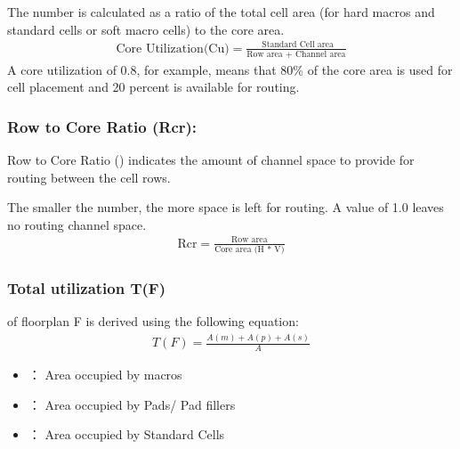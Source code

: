 \documentclass[letterpaper,10pt,english]{sphinxmanual}
\begin{document}
\sphinxAtStartPar
The number is calculated as a ratio of the total cell area (for hard macros and standard cells or soft macro cells) to the core area.
\begin{equation}\label{equation:chapter5/确定芯片面积:math-single}
\begin{split}\text{Core Utilization(Cu)} =\frac{\text{ Standard Cell area}}{\text{Row area + Channel area}}\end{split}
\end{equation}
\sphinxAtStartPar
A core utilization of 0.8, for example, means that 80\% of the core area is used for cell placement and 20 percent is available for routing.


\subsubsection{Row to Core Ratio (Rcr):}
\label{\detokenize{chapter5/_u786e_u5b9a_u82af_u7247_u9762_u79ef:row-to-core-ratio-rcr}}
\sphinxAtStartPar
Row to Core Ratio () indicates the amount of channel space to provide for routing between the cell rows.

\sphinxAtStartPar
The smaller the number, the more space is left for routing. A value of 1.0 leaves no routing channel space.
\begin{equation}\label{equation:chapter5/确定芯片面积:math-single}
\begin{split}\text{Rcr} = \frac{\text{Row area}}{\text{Core area (H * V)}}\end{split}
\end{equation}

\subsubsection{Total utilization T(F)}
\label{\detokenize{chapter5/_u786e_u5b9a_u82af_u7247_u9762_u79ef:total-utilization-t-f}}
\sphinxAtStartPar
{}  of floorplan F is derived using the following equation:
\begin{equation}\label{equation:chapter5/确定芯片面积:math-single}
\begin{split}T(F) =\frac{A(m) + A(p) + A(s)}{A}\end{split}
\end{equation}\begin{itemize}
\item {} 
\sphinxAtStartPar
{} ： Area occupied by macros

\item {} 
\sphinxAtStartPar
{} ： Area occupied by Pads/ Pad fillers

\item {} 
\sphinxAtStartPar
{} ： Area occupied by Standard Cells

\end{itemize}
\end{document}

